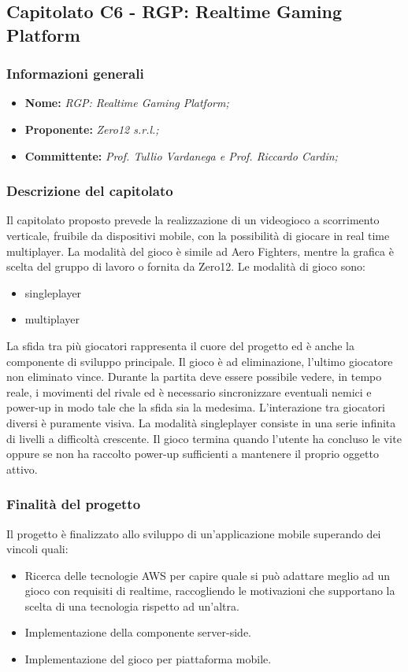 \subsection{Capitolato C6 - RGP: Realtime Gaming Platform}
\subsubsection{Informazioni generali}
	\begin{itemize}
	\item \textbf{Nome:} \textit{RGP: Realtime Gaming Platform;}
	\item \textbf{Proponente:} \textit{Zero12 s.r.l.;}
	\item \textbf{Committente:}  \textit{Prof. Tullio Vardanega e Prof. Riccardo Cardin;}
	\end{itemize}
\subsubsection{Descrizione del capitolato}
Il capitolato proposto prevede la realizzazione di un videogioco a scorrimento verticale, fruibile da dispositivi mobile, con la possibilità di giocare in real time multiplayer.
La modalità del gioco è simile ad Aero Fighters, mentre la grafica è scelta del gruppo di lavoro o fornita da Zero12.
Le modalità di gioco sono:
\begin{itemize}
	\item singleplayer
	\item multiplayer
\end{itemize}
La sfida tra più giocatori rappresenta il cuore del progetto ed è anche la componente di sviluppo principale.
Il gioco è ad eliminazione, l'ultimo giocatore non eliminato vince.
Durante la partita deve essere possibile vedere, in tempo reale, i movimenti del rivale ed è necessario sincronizzare eventuali nemici e power-up in modo tale che la sfida sia la medesima.
L'interazione tra giocatori diversi è puramente visiva.
La modalità singleplayer consiste in una serie infinita di livelli a difficoltà crescente. Il gioco termina quando l'utente ha concluso le vite oppure se non ha raccolto power-up sufficienti a mantenere il proprio oggetto attivo.

\subsubsection{Finalità del progetto}
Il progetto è finalizzato allo sviluppo di un'applicazione mobile superando dei vincoli quali:
\begin{itemize}
	\item Ricerca delle tecnologie AWS per capire quale si può adattare meglio ad un gioco con requisiti di realtime, raccogliendo le motivazioni che supportano la scelta di una tecnologia rispetto ad un'altra.
	\item Implementazione della componente server-side.
	\item Implementazione del gioco per piattaforma mobile.
\end{itemize}
